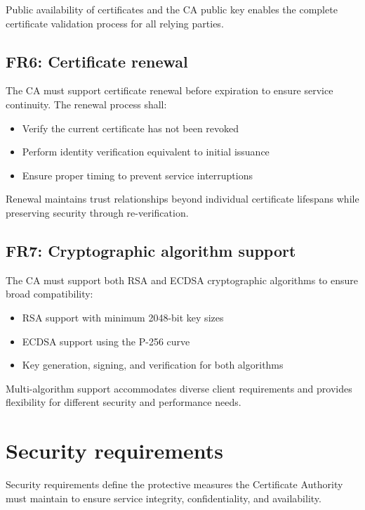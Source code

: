 Public availability of certificates and the CA public key enables the complete 
certificate validation process for all relying parties.

\subsection{FR6: Certificate renewal}

The CA must support certificate renewal before expiration to ensure service 
continuity. The renewal process shall:

\begin{itemize}
    \item Verify the current certificate has not been revoked
    \item Perform identity verification equivalent to initial issuance
    \item Ensure proper timing to prevent service interruptions
\end{itemize}

Renewal maintains trust relationships beyond individual certificate lifespans 
while preserving security through re-verification.

\subsection{FR7: Cryptographic algorithm support}

The CA must support both RSA and ECDSA cryptographic algorithms to ensure 
broad compatibility:

\begin{itemize}
    \item RSA support with minimum 2048-bit key sizes
    \item ECDSA support using the P-256 curve
    \item Key generation, signing, and verification for both algorithms
\end{itemize}

Multi-algorithm support accommodates diverse client requirements and provides 
flexibility for different security and performance needs.

\section{Security requirements}

Security requirements define the protective measures the Certificate Authority 
must maintain to ensure service integrity, confidentiality, and 
availability.


